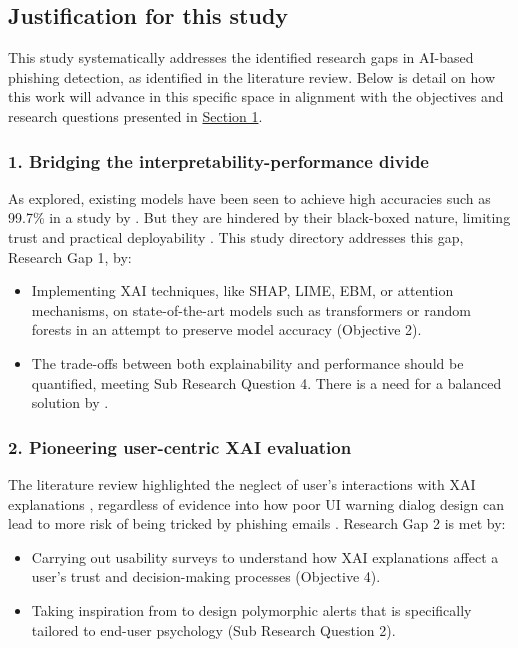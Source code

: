 \subsection*{Justification for this study}

This study systematically addresses the identified research gaps in AI-based phishing detection, as identified in the literature review. Below is detail on how this work will advance in this specific space in alignment with the objectives and research questions presented in \hyperref[sec:1-introduction]{Section 1}.

\subsubsection*{1. Bridging the interpretability-performance divide}
As explored, existing models have been seen to achieve high accuracies such as 99.7\% in a study by \cite{do2024integrated}. But they are hindered by their black-boxed nature, limiting trust and practical deployability \citep{atlam2022business}. This study directory addresses this gap, Research Gap 1, by:

\begin{itemize}
  \item Implementing XAI techniques, like SHAP, LIME, EBM, or attention mechanisms, on state-of-the-art models such as transformers or random forests in an attempt to preserve model accuracy (Objective 2).
  \item The trade-offs between both explainability and performance should be quantified, meeting Sub Research Question 4. There is a need for a balanced solution by \cite{alzahrani2024explainable}.
\end{itemize}

\subsubsection*{2. Pioneering user-centric XAI evaluation}
The literature review highlighted the neglect of user's interactions with XAI explanations \citep{vo2024securing}, regardless of evidence into how poor UI warning dialog design can lead to more risk of being tricked by phishing emails \citep{greco2023explaining}. Research Gap 2 is met by:

\begin{itemize}
  \item Carrying out usability surveys to understand how XAI explanations affect a user's trust and decision-making processes (Objective 4).
  \item Taking inspiration from \cite{anderson2015polymorphic} to design polymorphic alerts that is specifically tailored to end-user psychology (Sub Research Question 2).
\end{itemize}

